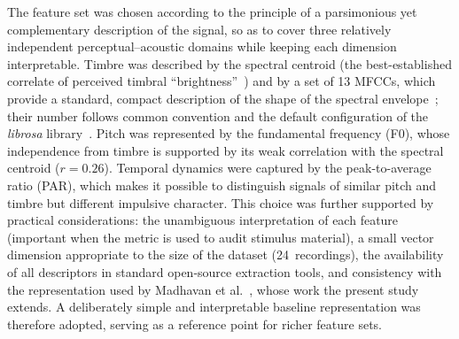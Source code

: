 \documentclass[preprint,12pt]{elsarticle}
\begin{document}
The feature set was chosen according to the principle of a parsimonious yet complementary description of the signal, so as to cover three relatively independent perceptual--acoustic domains while keeping each dimension interpretable. Timbre was described by the spectral centroid (the best-established correlate of perceived timbral ``brightness''~\cite{Grey1977Timbre,Lakatos2000Timbre,saitis2020brightness}) and by a set of 13 MFCCs, which provide a standard, compact description of the shape of the spectral envelope~\cite{Peeters2011TimbreToolbox,Siedenburg2017TimbreSimilarity,DeCamargo2017ProtaxSound}; their number follows common convention and the default configuration of the \textit{librosa} library~\cite{mcfee2015librosa}. Pitch was represented by the fundamental frequency (F0), whose independence from timbre is supported by its weak correlation with the spectral centroid ($r = 0.26$). Temporal dynamics were captured by the peak-to-average ratio (PAR), which makes it possible to distinguish signals of similar pitch and timbre but different impulsive character. This choice was further supported by practical considerations: the unambiguous interpretation of each feature (important when the metric is used to audit stimulus material), a small vector dimension appropriate to the size of the dataset (24~recordings), the availability of all descriptors in standard open-source extraction tools, and consistency with the representation used by Madhavan et al.~\cite{MadhavanWrobel2024MLT}, whose work the present study extends. A deliberately simple and interpretable baseline representation was therefore adopted, serving as a reference point for richer feature sets.
\end{document}
